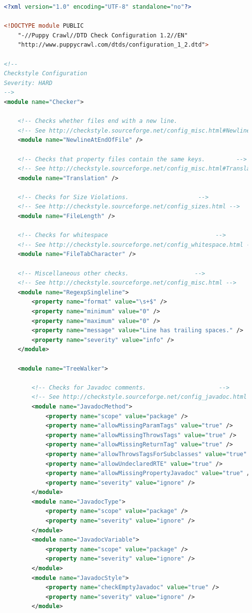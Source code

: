 \begin{lstlisting}[language=XML]
<?xml version="1.0" encoding="UTF-8" standalone="no"?>

<!DOCTYPE module PUBLIC
    "-//Puppy Crawl//DTD Check Configuration 1.2//EN"
    "http://www.puppycrawl.com/dtds/configuration_1_2.dtd">

<!--
Checkstyle Configuration
Severity: HARD
-->
<module name="Checker">

    <!-- Checks whether files end with a new line.                        -->
    <!-- See http://checkstyle.sourceforge.net/config_misc.html#NewlineAtEndOfFile -->
    <module name="NewlineAtEndOfFile" />

    <!-- Checks that property files contain the same keys.         -->
    <!-- See http://checkstyle.sourceforge.net/config_misc.html#Translation -->
    <module name="Translation" />

    <!-- Checks for Size Violations.                    -->
    <!-- See http://checkstyle.sourceforge.net/config_sizes.html -->
    <module name="FileLength" />

    <!-- Checks for whitespace                               -->
    <!-- See http://checkstyle.sourceforge.net/config_whitespace.html -->
    <module name="FileTabCharacter" />

    <!-- Miscellaneous other checks.                   -->
    <!-- See http://checkstyle.sourceforge.net/config_misc.html -->
    <module name="RegexpSingleline">
        <property name="format" value="\s+$" />
        <property name="minimum" value="0" />
        <property name="maximum" value="0" />
        <property name="message" value="Line has trailing spaces." />
        <property name="severity" value="info" />
    </module>

    <module name="TreeWalker">

        <!-- Checks for Javadoc comments.                     -->
        <!-- See http://checkstyle.sourceforge.net/config_javadoc.html -->
        <module name="JavadocMethod">
            <property name="scope" value="package" />
            <property name="allowMissingParamTags" value="true" />
            <property name="allowMissingThrowsTags" value="true" />
            <property name="allowMissingReturnTag" value="true" />
            <property name="allowThrowsTagsForSubclasses" value="true" />
            <property name="allowUndeclaredRTE" value="true" />
            <property name="allowMissingPropertyJavadoc" value="true" />
            <property name="severity" value="ignore" />
        </module>
        <module name="JavadocType">
            <property name="scope" value="package" />
            <property name="severity" value="ignore" />
        </module>
        <module name="JavadocVariable">
            <property name="scope" value="package" />
            <property name="severity" value="ignore" />
        </module>
        <module name="JavadocStyle">
            <property name="checkEmptyJavadoc" value="true" />
            <property name="severity" value="ignore" />
        </module>


\end{lstlisting}
